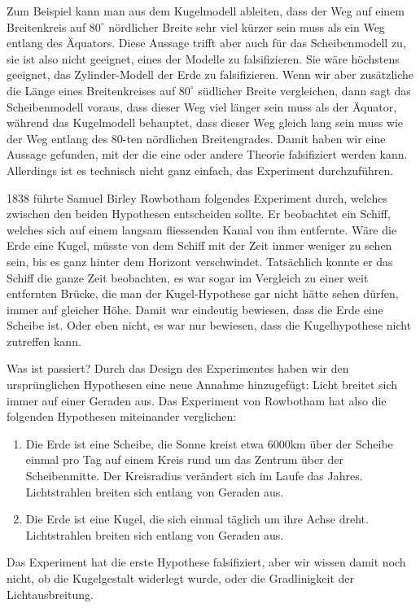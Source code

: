 Zum Beispiel kann man aus dem Kugelmodell ableiten, dass der Weg
auf einem Breitenkreis auf $80^\circ$ nördlicher Breite
sehr viel kürzer sein muss als ein Weg entlang des Äquators.
Diese Aussage trifft aber auch für das Scheibenmodell zu, sie
ist also nicht geeignet, eines der Modelle zu falsifizieren.
Sie wäre höchstens geeignet, das Zylinder-Modell der Erde
zu falsifizieren.
Wenn wir aber zusätzliche die Länge eines Breitenkreises 
auf $80^\circ$ südlicher Breite vergleichen, dann sagt
das Scheibenmodell voraus, dass dieser Weg viel länger
sein muss als der Äquator, während das Kugelmodell behauptet,
dass dieser Weg gleich lang sein muss wie der Weg entlang des
$80$-ten nördlichen Breitengrades.
Damit haben wir eine Aussage gefunden, mit der die eine oder andere
Theorie falsifiziert werden kann.
Allerdings ist es technisch nicht ganz einfach, das Experiment
durchzuführen.

1838 führte Samuel Birley Rowbotham folgendes Experiment durch,
welches zwischen den beiden Hypothesen entscheiden sollte.
Er beobachtet ein Schiff, welches sich auf einem langsam fliessenden
Kanal von ihm entfernte.
Wäre die Erde eine Kugel, müsste von dem Schiff mit der Zeit
immer weniger zu sehen sein, bis es ganz hinter dem Horizont
verschwindet.
Tatsächlich konnte er das Schiff die ganze Zeit beobachten, es
war sogar im Vergleich zu einer weit entfernten Brücke, die
man der Kugel-Hypothese gar nicht hätte sehen dürfen, immer auf
gleicher Höhe.
Damit war eindeutig bewiesen, dass die Erde eine Scheibe ist.
Oder eben nicht, es war nur bewiesen, dass die Kugelhypothese
nicht zutreffen kann.

Was ist passiert? 
Durch das Design des Experimentes haben wir den ursprünglichen
Hypothesen eine neue Annahme hinzugefügt: Licht breitet sich
immer auf einer Geraden aus.
Das Experiment von Rowbotham hat also die folgenden Hypothesen miteinander
verglichen:
\begin{enumerate}
\item Die Erde ist eine Scheibe, die Sonne kreist etwa 6000km über der
Scheibe einmal pro Tag auf einem Kreis rund um das Zentrum über der
Scheibenmitte. 
Der Kreisradius verändert sich im Laufe das Jahres.
Lichtstrahlen breiten sich entlang von Geraden aus.
\item Die Erde ist eine Kugel, die sich einmal täglich um ihre
Achse dreht.
Lichtstrahlen breiten sich entlang von Geraden aus.
\end{enumerate}
Das Experiment hat die erste Hypothese falsifiziert, aber wir wissen
damit noch nicht, ob die Kugelgestalt widerlegt wurde, oder die
Gradlinigkeit der Lichtausbreitung.

